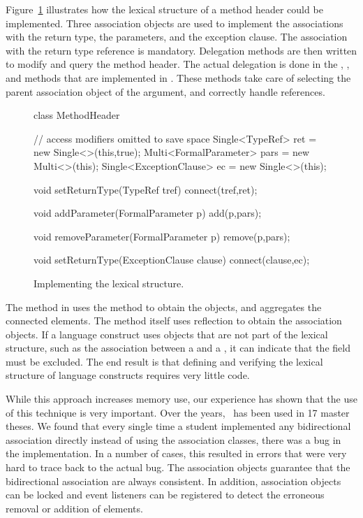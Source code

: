 Figure~\ref{implement} illustrates how the lexical structure of a method header could be implemented. Three association objects are used to implement the associations with the return type, the parameters, and the exception clause. The association with the return type reference is mandatory. Delegation methods are then written to modify and query the method header. The actual delegation is done in the , , and  methods that are implemented in . These methods take care of selecting the parent association object of the argument, and correctly handle  references.

\begin{figure}
\begin{java}
class MethodHeader {
  // access modifiers omitted to save space
  Single<TypeRef> ret = new Single<>(this,true);
  Multi<FormalParameter> pars = new Multi<>(this);
  Single<ExceptionClause> ec = new Single<>(this);

  void setReturnType(TypeRef tref)
    {connect(tref,ret);}

  void addParameter(FormalParameter p)
    {add(p,pars);}

  void removeParameter(FormalParameter p)
    {remove(p,pars);}

  void setReturnType(ExceptionClause clause)
    {connect(clause,ec);}
} 
\end{java}
\caption{Implementing the lexical structure.\label{implement}}
\end{figure}

The  method in  uses the  method to obtain the  objects, and aggregates the connected elements. The  method itself uses reflection to obtain the association objects. If a language construct uses  objects that are not part of the lexical structure, such as the association between a  and a , it can indicate that the field must be excluded. The end result is that defining and verifying the lexical structure of language constructs requires very little code.

While this approach increases memory use, our experience has shown that the use of this technique is very important. Over the years, \chameleon\ has been used in 17 master theses. We found that every single time a student implemented any bidirectional association directly instead of using the association classes, there was a bug in the implementation. In a number of cases, this resulted in errors that were very hard to trace back to the actual bug. The association objects guarantee that the bidirectional association are always consistent. In addition, association objects can be locked and event listeners can be registered to detect the erroneous removal or addition of elements.

